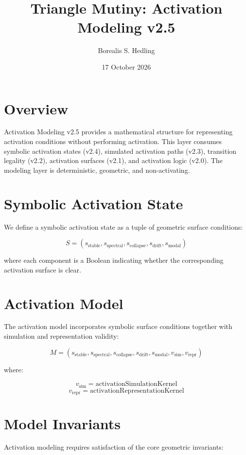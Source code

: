 \documentclass[11pt]{article}
\title{Triangle Mutiny: Activation Modeling v2.5}
\author{Borealis S. Hedling}
\date{17 October 2026}
\begin{document}
\maketitle

\section*{Overview}

Activation Modeling v2.5 provides a mathematical structure for representing
activation conditions without performing activation. This layer consumes
symbolic activation states (v2.4), simulated activation paths (v2.3),
transition legality (v2.2), activation surfaces (v2.1), and activation logic
(v2.0). The modeling layer is deterministic, geometric, and non-activating.

\section*{Symbolic Activation State}

We define a symbolic activation state as a tuple of geometric surface
conditions:

\[
S = (s_{\text{stable}}, s_{\text{spectral}}, s_{\text{collapse}},
     s_{\text{drift}}, s_{\text{modal}})
\]

where each component is a Boolean indicating whether the corresponding
activation surface is clear.

\section*{Activation Model}

The activation model incorporates symbolic surface conditions together with
simulation and representation validity:

\[
M = (s_{\text{stable}}, s_{\text{spectral}}, s_{\text{collapse}},
     s_{\text{drift}}, s_{\text{modal}},
     v_{\text{sim}}, v_{\text{repr}})
\]

where:

\[
v_{\text{sim}} = \text{activationSimulationKernel}
\]
\[
v_{\text{repr}} = \text{activationRepresentationKernel}
\]

\section*{Model Invariants}

Activation modeling requires satisfaction of the core geometric invariants:
\end{document}
